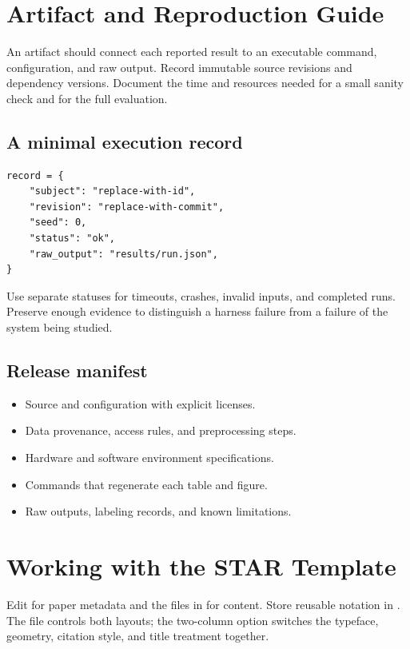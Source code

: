 \section{Artifact and Reproduction Guide}
\label{app:artifact}
An artifact should connect each reported result to an executable command,
configuration, and raw output. Record immutable source revisions and
dependency versions. Document the time and resources needed for a small
sanity check and for the full evaluation.

\subsection{A minimal execution record}
\begin{lstlisting}[language=STARPython,caption={Illustrative record format;
replace fields with the study's actual schema.},label={lst:record}]
record = {
    "subject": "replace-with-id",
    "revision": "replace-with-commit",
    "seed": 0,
    "status": "ok",
    "raw_output": "results/run.json",
}
\end{lstlisting}

Use separate statuses for timeouts, crashes, invalid inputs, and completed
runs. Preserve enough evidence to distinguish a harness failure from a
failure of the system being studied.

\subsection{Release manifest}
\begin{itemize}
  \item Source and configuration with explicit licenses.
  \item Data provenance, access rules, and preprocessing steps.
  \item Hardware and software environment specifications.
  \item Commands that regenerate each table and figure.
  \item Raw outputs, labeling records, and known limitations.
\end{itemize}

\newpage
\section{Working with the STAR Template}
Edit  for paper metadata and the files in
 for content. Store reusable notation in
. The  file controls both layouts;
the two-column option switches the typeface, geometry, citation style,
and title treatment together.

